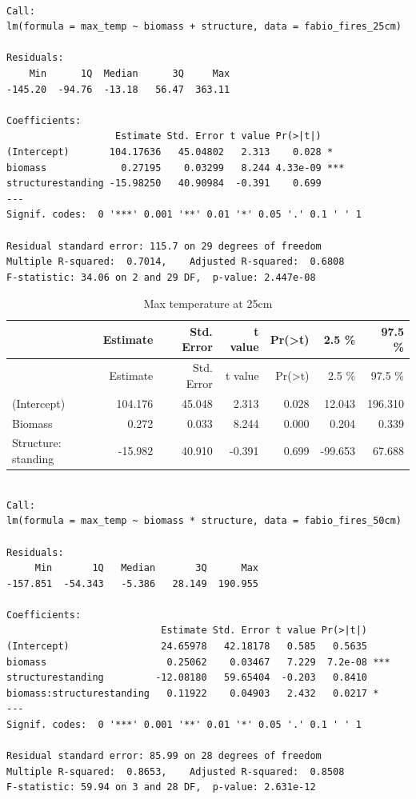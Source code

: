 \documentclass[11pt,a4paper]{article}
\begin{document}
\begin{verbatim}

Call:
lm(formula = max_temp ~ biomass + structure, data = fabio_fires_25cm)

Residuals:
    Min      1Q  Median      3Q     Max 
-145.20  -94.76  -13.18   56.47  363.11 

Coefficients:
                   Estimate Std. Error t value Pr(>|t|)    
(Intercept)       104.17636   45.04802   2.313    0.028 *  
biomass             0.27195    0.03299   8.244 4.33e-09 ***
structurestanding -15.98250   40.90984  -0.391    0.699    
---
Signif. codes:  0 '***' 0.001 '**' 0.01 '*' 0.05 '.' 0.1 ' ' 1

Residual standard error: 115.7 on 29 degrees of freedom
Multiple R-squared:  0.7014,    Adjusted R-squared:  0.6808 
F-statistic: 34.06 on 2 and 29 DF,  p-value: 2.447e-08
\end{verbatim}

\begin{longtable}[]{@{}lrrrrrr@{}}
\caption{Max temperature at 25cm}\tabularnewline
\toprule
& Estimate & Std. Error & t value &
Pr(\textgreater{}\textbar{}t\textbar{}) & 2.5 \% & 97.5
\%\tabularnewline
\midrule
\endfirsthead
\toprule
& Estimate & Std. Error & t value &
Pr(\textgreater{}\textbar{}t\textbar{}) & 2.5 \% & 97.5
\%\tabularnewline
\midrule
\endhead
(Intercept) & 104.176 & 45.048 & 2.313 & 0.028 & 12.043 &
196.310\tabularnewline
Biomass & 0.272 & 0.033 & 8.244 & 0.000 & 0.204 & 0.339\tabularnewline
Structure: standing & -15.982 & 40.910 & -0.391 & 0.699 & -99.653 &
67.688\tabularnewline
\bottomrule
\end{longtable}

\begin{verbatim}

Call:
lm(formula = max_temp ~ biomass * structure, data = fabio_fires_50cm)

Residuals:
     Min       1Q   Median       3Q      Max 
-157.851  -54.343   -5.386   28.149  190.955 

Coefficients:
                           Estimate Std. Error t value Pr(>|t|)    
(Intercept)                24.65978   42.18178   0.585   0.5635    
biomass                     0.25062    0.03467   7.229  7.2e-08 ***
structurestanding         -12.08180   59.65404  -0.203   0.8410    
biomass:structurestanding   0.11922    0.04903   2.432   0.0217 *  
---
Signif. codes:  0 '***' 0.001 '**' 0.01 '*' 0.05 '.' 0.1 ' ' 1

Residual standard error: 85.99 on 28 degrees of freedom
Multiple R-squared:  0.8653,    Adjusted R-squared:  0.8508 
F-statistic: 59.94 on 3 and 28 DF,  p-value: 2.631e-12
\end{verbatim}
\end{document}
